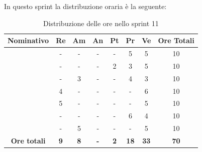 In questo sprint la distribuzione oraria è la seguente:
\begin{table}[H]
		\begin{center}
			\setlength{\aboverulesep}{0pt}
			\setlength{\belowrulesep}{0pt}
			\setlength{\extrarowheight}{.75ex}
			\begin{tabular}{ c c c c c c c c }
				\rowcolor{AzzurroGruppo!30} 
				\textbf{Nominativo} & \textbf{Re} & \textbf{Am} & \textbf{An} & \textbf{Pt} & \textbf{Pr} & \textbf{Ve} & \textbf{Ore Totali}  \\
				\toprule
				\Davide    & - & - & - & - & 5 & 5 & 10 \\
				\Giosue    & - & - & - & 2 & 3 & 5 & 10 \\
				\Francesco & - & 3 & - & - & 4 & 3 & 10\\
				\Daniele   & 4 & - & - & - & - & 6 & 10\\
				\Lucrezia  & 5 & - & - & - & - & 5 & 10\\
				\Matteo    & - & - & - & - & 6 & 4 & 10\\
				\Tommaso   & - & 5 & - & - & - & 5 & 10\\
				 \textbf{Ore totali} & \textbf{9} & \textbf{8} & \textbf{-} & \textbf{2} & \textbf{18} & \textbf{33} & \textbf{70} \\
				\bottomrule
			\end{tabular}
			\caption{Distribuzione delle ore nello sprint 11}
		\end{center}
	\end{table}


